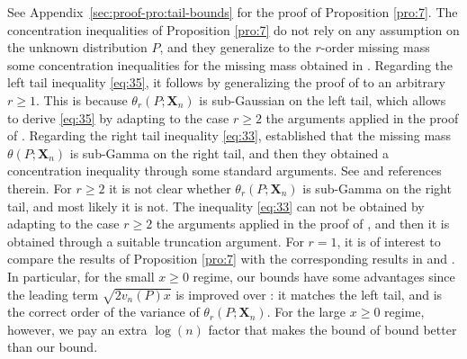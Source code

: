 \documentclass{article}
\newcommand{\1}{\boldsymbol{1}}
\theoremstyle{plain}
\begin{document}
See Appendix~\ref{sec:proof-pro:tail-bounds} for the proof of Proposition \ref{pro:7}. The concentration inequalities of Proposition \ref{pro:7} do not rely on any assumption on the unknown distribution $P$, and they generalize to the $r$-order missing mass some concentration inequalities for the missing mass obtained in \cite{McA(03),Oha(12),Ben(17)}.  Regarding the left tail inequality \eqref{eq:35}, it follows by generalizing the proof of \cite[Proposition 3.7]{Ben(17)} to an arbitrary $r\geq1$. This is because $\theta_r(P;\mathbf{X}_n)$ is sub-Gaussian on the left tail, which allows to derive \eqref{eq:35} by adapting to the case $r\geq2$ the arguments applied in the proof of \cite[Proposition 3.7]{Ben(17)}. Regarding the right tail inequality \eqref{eq:33}, \cite[Theorem 3.9]{Ben(17)} established that the missing mass $\theta(P;\mathbf{X}_n)$ is sub-Gamma on the right tail, and then they obtained a concentration inequality through some standard arguments. See \cite[Chapter 2 and Chapter 3]{BLM(13)} and references therein. For $r \geq 2$ it is not clear whether $\theta_r(P;\mathbf{X}_n)$ is sub-Gamma on the right tail, and most likely it is not. The inequality \eqref{eq:33} can not be obtained by adapting to the case $r\geq2$ the arguments applied in the proof of \cite[Theorem 3.9]{Ben(17)}, and then it is obtained through a suitable truncation argument. For $r=1$, it is of interest to compare the results of Proposition \ref{pro:7} with the corresponding results in \cite[Proposition 3.7]{Ben(17)} and \cite[Theorem 3.9]{Ben(17)}. In particular, for the small $x \geq 0$ regime, our bounds have some advantages since the leading term $\sqrt{2v_n(P)x}$ is improved over \cite{Ben(17)}: it matches the left tail, and is the correct order of the variance of $\theta_r(P;\mathbf{X}_n)$. For the large $x \geq 0$ regime, however, we pay an extra $\log(n)$ factor that makes the bound of \cite{Ben(17)} bound better than our bound.
\end{document}
